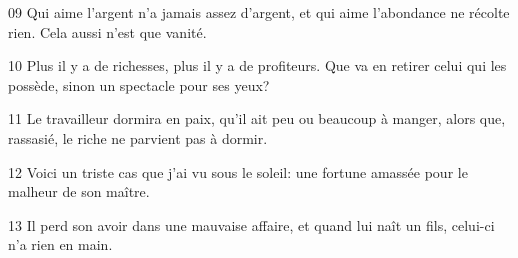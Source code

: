
09 Qui aime l’argent n’a jamais assez d’argent, et qui aime l’abondance ne récolte rien. Cela aussi n’est que vanité.

10 Plus il y a de richesses, plus il y a de profiteurs. Que va en retirer celui qui les possède, sinon un spectacle pour ses yeux?

11 Le travailleur dormira en paix, qu’il ait peu ou beaucoup à manger, alors que, rassasié, le riche ne parvient pas à dormir.

12 Voici un triste cas que j’ai vu sous le soleil: une fortune amassée pour le malheur de son maître.

13 Il perd son avoir dans une mauvaise affaire, et quand lui naît un fils, celui-ci n’a rien en main.